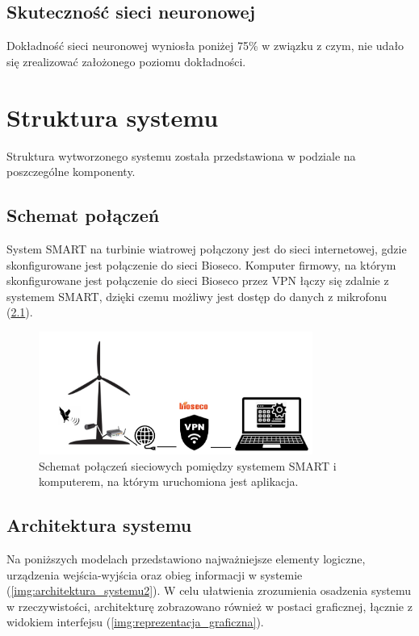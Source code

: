 \documentclass{sprz}
\begin{document}
\section{Skuteczność sieci neuronowej}
Dokładność sieci neuronowej wyniosła poniżej 75\% w związku z czym, nie udało się zrealizować założonego poziomu dokładności.

\chapter{Struktura systemu}

Struktura wytworzonego systemu została przedstawiona w podziale na poszczególne komponenty.

\section{Schemat połączeń}
System SMART na turbinie wiatrowej połączony jest do sieci internetowej, gdzie skonfigurowane jest połączenie do sieci Bioseco. Komputer firmowy, na którym skonfigurowane jest połączenie do sieci Bioseco przez VPN łączy się zdalnie z systemem SMART, dzięki czemu możliwy jest dostęp do danych z mikrofonu (\ref{img:system-connection}).

\begin{figure}[h] 
  \centering
  \includegraphics[width=0.8\textwidth]{sprz/system-connection.png}
  \caption{Schemat połączeń sieciowych pomiędzy systemem SMART i komputerem, na którym uruchomiona jest aplikacja.}
  \label{img:system-connection}
\end{figure} 


\section{Architektura systemu}

Na poniższych modelach przedstawiono najważniejsze elementy logiczne, urządzenia wejścia-wyjścia oraz obieg informacji w systemie (\ref{img:architektura_systemu2}). W celu ułatwienia zrozumienia osadzenia systemu w rzeczywistości, architekturę zobrazowano również w postaci graficznej, łącznie z widokiem interfejsu (\ref{img:reprezentacja_graficzna}). 
\end{document}
